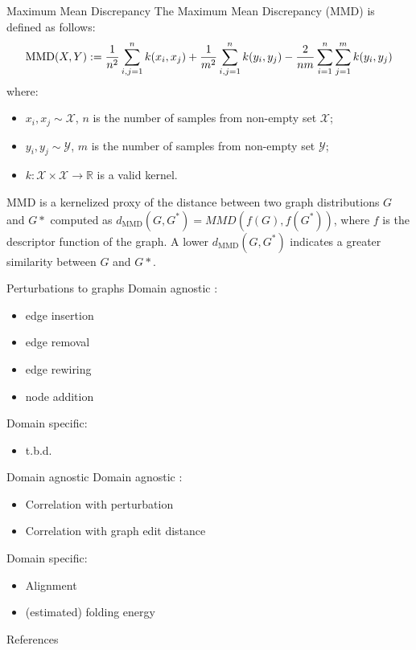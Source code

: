 \documentclass[aspectratio=169, 10pt, dvipsnames, handout]{beamer}
\begin{document}
\begin{frame}[fragile]{Maximum Mean Discrepancy}
  The Maximum Mean Discrepancy (MMD) \cite{gretton2012kernel,borgwardt2006integrating} is defined as follows:
  \begin{equation*}
    \label{eq:mmd}
    \text{MMD}(X, Y) := {1\over n^2} \sum_{i,j=1}^{n}k(x_i, x_j) + {1\over m^2} \sum_{i,j=1}^{n}k(y_i, y_j) - {2\over nm} \sum_{i=1}^{n}\sum_{j=1}^{m}k(y_i, y_j)
  \end{equation*}
  where:
  \begin{itemize}
  \item  $x_i, x_j \sim \mathcal{X}$, $n$ is the number of samples from non-empty set $\mathcal{X}$;
  \item  $y_i, y_j \sim \mathcal{Y}$, $m$ is the number of samples from non-empty set $\mathcal{Y}$;
  \item $k: \mathcal{X}\times\mathcal{X}\to\mathbb{R}$ is a valid kernel.
  \end{itemize}
  MMD is a kernelized proxy of the distance between two graph distributions $G$ and $G*$ computed as $d_{\text{MMD}}(G,G^*)=MMD(f(G),f(G^*))$, where $f$ is the descriptor function of the graph. A lower $d_{\text{MMD}}(G,G^*)$ indicates a greater similarity between $G$ and $G*$.

\end{frame}

\begin{frame}[fragile]{Perturbations to graphs}
  Domain agnostic \cite{o2021evaluation}:
  \begin{itemize}
  \item edge insertion
  \item edge removal
  \item edge rewiring
  \item node addition
  \end{itemize}

  Domain specific:
  \begin{itemize}
  \item t.b.d.
  \end{itemize}
\end{frame}


\begin{frame}[fragile]{Domain agnostic}
  Domain agnostic \cite{o2021evaluation}:
  \begin{itemize}
  \item Correlation with perturbation
  \item Correlation with graph edit distance
  \end{itemize}

  Domain specific:
  \begin{itemize}
  \item Alignment
  \item (estimated) folding energy
  \end{itemize}
\end{frame}


\begin{frame}[allowframebreaks]{References}

  
  

\end{frame}
\end{document}
